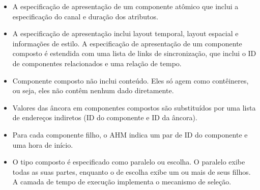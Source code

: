 \begin{itemize}
 \item A especificação de apresentação de um componente atômico que inclui a especificação do canal e duração dos atributos.
 \item A especificação de apresentação inclui layout temporal, layout espacial e informações de estilo. A especificação de apresentação de um componente composto é estendida com uma lista de links de sincronização, que inclui o ID de componentes relacionados e uma relação de tempo.
 \item Componente composto não inclui conteúdo. Eles só agem como contêineres, ou seja, eles não contêm nenhum dado diretamente.
 \item Valores das âncora em componentes compostos são substituídos por uma lista de endereços indiretos (ID do componente e ID da âncora).
 \item Para cada componente filho, o AHM indica um par de ID do componente e uma hora de início.
 \item O tipo composto é especificado como paralelo ou escolha. O paralelo exibe todas as suas partes, enquanto o de escolha exibe um ou mais de seus filhos. A camada de tempo de execução implementa o mecanismo de seleção.
\end{itemize}

